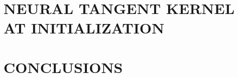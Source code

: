 \documentclass[accepted]{uai2023}
\begin{document}
\section{NEURAL TANGENT KERNEL AT INITIALIZATION}
\label{sec:arXiv_ntk}


%

% 


\section{CONCLUSIONS}
\label{sec:arXiv_conc}



%

%
%







%
\end{document}
